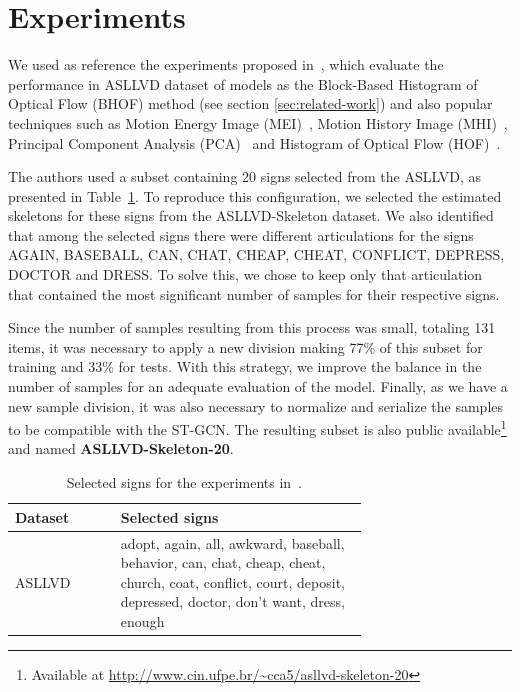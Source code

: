 \section{Experiments} 
\label{sec:experiments}

We used as reference the experiments proposed in~\cite{lim-2016}, which evaluate the performance in ASLLVD dataset of models as the Block-Based Histogram of Optical Flow (BHOF) method (see section \ref{sec:related-work}) and also popular techniques such as Motion Energy Image (MEI)~\cite{athitsos-asllvd-2008}, Motion History Image (MHI)~\cite{babu-2004}, Principal Component Analysis (PCA)~\cite{dreuw-2012} and Histogram of Optical Flow (HOF)~\cite{laptev-2008}.

The authors used a subset containing 20 signs selected from the ASLLVD, as presented in Table~\ref{tab:asllvd-20}. To reproduce this configuration, we selected the estimated skeletons for these signs from the ASLLVD-Skeleton dataset. 
We also identified that among the selected signs there were different articulations for the signs AGAIN, BASEBALL, CAN, CHAT, CHEAP, CHEAT, CONFLICT, DEPRESS, DOCTOR and DRESS. To solve this, we chose to keep only that articulation that contained the most significant number of samples for their respective signs.

Since the number of samples resulting from this process was small, totaling 131 items, it was necessary to apply a new division making 77\% of this subset for training and 33\% for tests. With this strategy, we improve the balance in the number of samples for an adequate evaluation of the model. Finally, as we have a new sample division, it was also necessary to normalize and serialize the samples to be compatible with the ST-GCN. The resulting subset is also public available\footnote{ Available at \url{http://www.cin.ufpe.br/~cca5/asllvd-skeleton-20} } and named \textbf{ASLLVD-Skeleton-20}.

\begin{table}[ht]
\centering
\caption{Selected signs for the experiments in~\cite{lim-2016}.}
\label{tab:asllvd-20}
\begin{tabular}{ l | p{0.7\linewidth} }
\hline
Dataset & Selected signs \\ \hline
ASLLVD & adopt, again, all, awkward, baseball, behavior, can, chat, cheap, cheat, church, coat, conflict, court, deposit, depressed, doctor, don’t want, dress, enough \\ \hline
\end{tabular}
\end{table}

